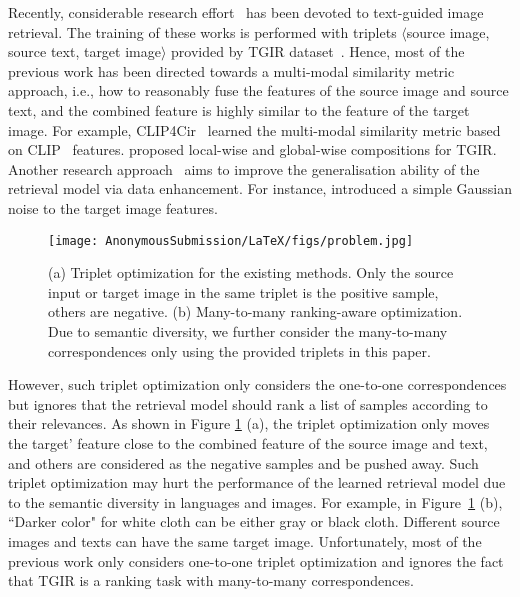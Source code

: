 \documentclass[letterpaper]{article} \usepackage{aaai24}  \usepackage{times}  \usepackage{helvet}  \usepackage{courier}  \usepackage[hyphens]{url}  \usepackage{graphicx} \urlstyle{rm} \def\UrlFont{\rm}  \usepackage{natbib}  \usepackage{caption} \frenchspacing  \setlength{\pdfpagewidth}{8.5in} \setlength{\pdfpageheight}{11in} \usepackage{amsmath,amsfonts}
\begin{document}
Recently, considerable research effort~\cite{TIRG, Chen_2020_CVPR, zhang2020joint, CLVC-Net, CLIP4Cir, chen2022composed} has been devoted to text-guided image retrieval.
The training of these works is performed with triplets $\langle$source image, source text, target image$\rangle$ provided by TGIR dataset~\cite{guo2019fashion, liu2021image}. Hence, most of the previous work has been directed towards a multi-modal similarity metric approach, i.e., how to reasonably fuse the features of the source image and source text, and the combined feature is highly similar to the feature of the target image. For example, CLIP4Cir~\cite{CLIP4Cir} learned the multi-modal similarity metric based on CLIP~\cite{Radford2021CLIP} features. \cite{CLVC-Net} proposed local-wise and global-wise compositions for TGIR. Another research approach~\cite{yan2020deep, Warburg2021iccv, chen2022composed} aims to improve the generalisation ability of the retrieval model via data enhancement. For instance, \cite{chen2022composed} introduced a simple Gaussian noise to the target image features. 


\begin{figure}
    \centering
    \texttt{[image: AnonymousSubmission/LaTeX/figs/problem.jpg]}
    \caption{(a) Triplet optimization for the existing methods. Only the source input or target image in the same triplet is the positive sample, others are negative. (b) Many-to-many ranking-aware optimization. Due to semantic diversity, we further consider the many-to-many correspondences only using the provided triplets in this paper.}
    \label{fig:problem}
\end{figure}
However, such triplet optimization only considers the one-to-one correspondences but ignores that the retrieval model should rank a list of samples according to their relevances. As shown in Figure \ref{fig:problem}  (a), the triplet optimization only moves the target' feature close to the combined feature of the source image and text, and others are considered as the negative samples and be pushed away. Such triplet optimization may hurt the performance of the learned retrieval model due to the semantic diversity in languages and images. For example, in Figure~\ref{fig:problem}  (b), ``Darker color" for  white cloth can be either gray or black cloth.  Different source images and texts can have the same target image. Unfortunately, most of the previous work only considers one-to-one triplet optimization and ignores the fact that TGIR is a ranking task with many-to-many correspondences. 
\end{document}
